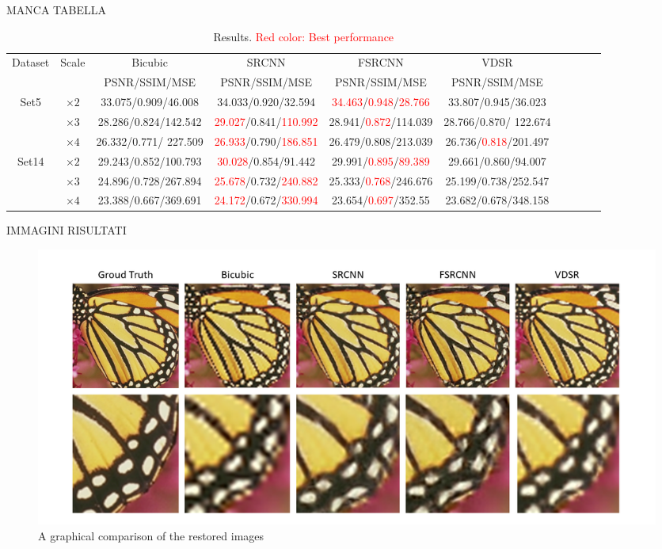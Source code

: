 \documentclass[10pt,twocolumn,letterpaper]{article}
\begin{document}
MANCA TABELLA 
\begin{table}
\begin{center}
	\begin{tabular}{|c| c| c| c| c| c| c| c| c| c|} 
		
		\hline
		Dataset & Scale & Bicubic  & SRCNN & FSRCNN & VDSR\\ 
		 &  & PSNR/SSIM/MSE &PSNR/SSIM/MSE & PSNR/SSIM/MSE & PSNR/SSIM/MSE \\ 
		\hline
		\multirow{3}{*}{Set5} & $\times2$ & 33.075/0.909/46.008 & 34.033/0.920/32.594 & \textcolor{red}{34.463}/\textcolor{red}{0.948}/\textcolor{red}{28.766} & 33.807/0.945/36.023 \\
		 									& $\times3$ & 28.286/0.824/142.542 & \textcolor{red}{29.027}/0.841/\textcolor{red}{110.992} & 28.941/\textcolor{red}{0.872}/114.039 & 28.766/0.870/ 122.674\\
		 									& $\times4$ & 26.332/0.771/ 227.509 & \textcolor{red}{26.933}/0.790/\textcolor{red}{186.851} & 26.479/0.808/213.039 & 26.736/\textcolor{red}{0.818}/201.497 \\
		\hline
		\multirow{3}{*}{Set14} & $\times2$ & 29.243/0.852/100.793 & \textcolor{red}{30.028}/0.854/91.442 & 29.991/\textcolor{red}{0.895}/\textcolor{red}{89.389} & 29.661/0.860/94.007 \\
											& $\times3$ & 24.896/0.728/267.894 & \textcolor{red}{25.678}/0.732/\textcolor{red}{240.882} & 25.333/\textcolor{red}{0.768}/246.676 &25.199/0.738/252.547 \\
											& $\times4$ &23.388/0.667/369.691 & \textcolor{red}{24.172}/0.672/\textcolor{red}{330.994} & 23.654/\textcolor{red}{0.697}/352.55 & 23.682/0.678/348.158 \\
		\hline
	\end{tabular}
\label{results}
\end{center}
\caption{Results. \textcolor{red}{Red color: Best performance}}
\end{table}
IMMAGINI RISULTATI
\begin{figure}[]
	\centering
	\includegraphics[width=\textwidth]{img/RESULTS.png}
	\caption{A graphical comparison of the restored images}
	\label{imgres}
\end{figure}
\end{document}
